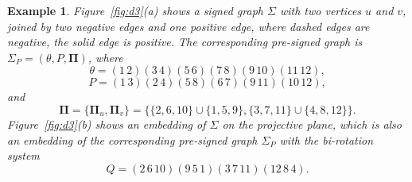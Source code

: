 \documentclass[10pt,a4paper]{amsart}
\newtheorem{example}[theorem]{Example}
\begin{document}
\begin{example}
Figure~\ref{fig:d3}(a) shows a signed graph $\Sigma$ with two vertices $u$ and $v$, joined by two negative edges and one positive edge, where
dashed edges are negative, the solid edge is positive. The corresponding pre-signed graph is $\Sigma_P=(\theta,P,\mathbf{\Pi})$, where
$$\theta=(1\,2)(3\,4)(5\,6)(7\,8)(9\,10)(11\,12),$$
$$P=(1\,3)(2\,4)(5\,8)(6\,7)(9\,11)(10\,12),$$
and
$$\mathbf{\Pi} = \{ \mathbf{\Pi}_u,\mathbf{\Pi}_v\}=\bigl\{ \{2,6,10\}\cup\{1,5,9\}, \{3,7,11\}\cup\{4,8,12\} \bigr\}.$$
Figure~\ref{fig:d3}(b) shows an embedding of $\Sigma$ on the projective plane, which is also an embedding of the corresponding pre-signed graph $\Sigma_P$ with the bi-rotation system
$$Q=(2\,6\,10)(9\,5\,1)(3\,7\,11)(12\,8\,4).
$$\end{example}
\end{document}
